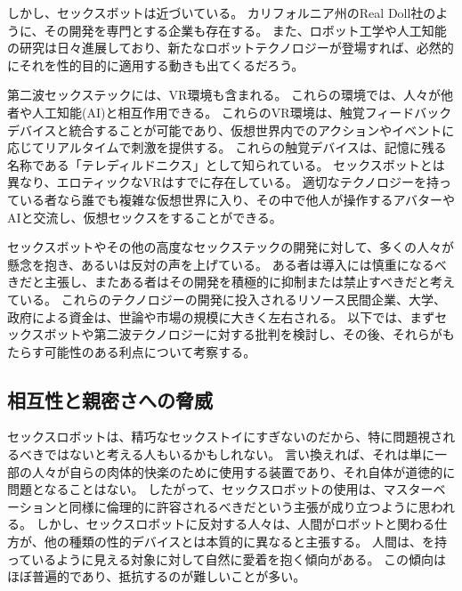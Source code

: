 \documentclass[paper=a4,book,openany]{jlreq} \usepackage{mystyle}
\begin{document}
しかし、セックスボットは近づいている。
カリフォルニア州のReal Doll社のように、その開発を専門とする企業も存在する。
また、ロボット工学や人工知能の研究は日々進展しており、新たなロボットテクノロジーが登場すれば、必然的にそれを性的目的に適用する動きも出てくるだろう。

第二波セックステックには、VR環境も含まれる。
これらの環境では、人々が他者や人工知能(AI)と相互作用できる。
これらのVR環境は、触覚フィードバックデバイスと統合することが可能であり、仮想世界内でのアクションやイベントに応じてリアルタイムで刺激を提供する。
これらの触覚デバイスは、記憶に残る名称である「テレディルドニクス」として知られている。
セックスボットとは異なり、エロティックなVRはすでに存在している。
適切なテクノロジーを持っている者なら誰でも複雑な仮想世界に入り、その中で他人が操作するアバターやAIと交流し、仮想セックスをすることができる。

セックスボットやその他の高度なセックステックの開発に対して、多くの人々が懸念を抱き、あるいは反対の声を上げている。
ある者は導入には慎重になるべきだと主張し、またある者はその開発を積極的に抑制または禁止すべきだと考えている。
これらのテクノロジーの開発に投入されるリソース{\DDASH}民間企業、大学、政府による資金{\DDASH}は、世論や市場の規模に大きく左右される。
以下では、まずセックスボットや第二波テクノロジーに対する批判を検討し、その後、それらがもたらす可能性のある利点について考察する。

\subsection{相互性と親密さへの脅威}

セックスロボットは、精巧なセックストイにすぎないのだから、特に問題視されるべきではないと考える人もいるかもしれない。
言い換えれば、それは単に一部の人々が自らの肉体的快楽のために使用する装置であり、それ自体が道徳的に問題となることはない。
したがって、セックスロボットの使用は、マスターベーションと同様に倫理的に許容されるべきだという主張が成り立つように思われる。
しかし、セックスロボットに反対する人々は、人間がロボットと関わる仕方が、他の種類の性的デバイスとは本質的に異なると主張する。
人間は、を持っているように見える対象に対して自然に愛着を抱く傾向がある。
この傾向はほぼ普遍的であり、抵抗するのが難しいことが多い。
\end{document}
